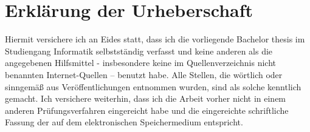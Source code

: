 \documentclass[12pt,final,twoside]{report}
\newcommand{\trtype}{Bachelor thesis} %
\newcommand{\trcourseofstudies}{Informatik} %
\theoremstyle{plain}
\theoremstyle{definition}
\theoremstyle{remark}
\begin{document}
\fancyhead[LE]{\it \leftmark}           %
\fancyhead[RO]{\it \rightmark}          %
\fancyhead[LO,RE]{}                     %




\appendix
\fancyhead[LO,RE]{}                      %

%   

%   

%   


    
\cleardoublepage

\vspace{2cm}
\chapter*{Erkl\"arung der Urheberschaft}
\label{sec:urheber}
	Hiermit versichere ich an Eides statt, dass ich die vorliegende
	\trtype{} im Studiengang \trcourseofstudies{}
	selbstst{\"a}ndig verfasst und keine anderen als die angegebenen
	Hilfsmittel - insbesondere keine im Quellenverzeichnis nicht
	benannten Internet-Quellen – benutzt habe. Alle Stellen, die
	w{\"o}rtlich oder sinngem{\"a}{\ss} aus Ver{\"o}ffentlichungen entnommen wurden,
	sind als solche kenntlich gemacht. Ich versichere weiterhin, dass
	ich die Arbeit vorher nicht in einem anderen Pr{\"u}fungsverfahren
	eingereicht habe und die eingereichte schriftliche Fassung der
	auf dem elektronischen Speichermedium entspricht.
	
\end{document}
